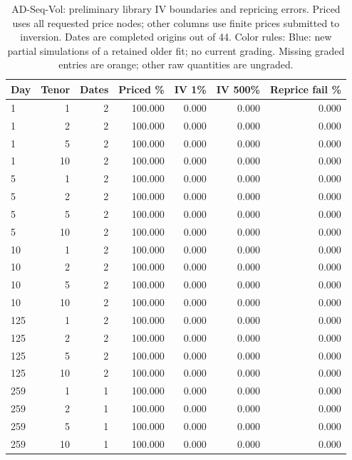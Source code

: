 \documentclass[11pt]{article}
\begin{document}
\begin{table}[H]\centering\small\setlength{\tabcolsep}{4pt}
\caption{AD-Seq-Vol: preliminary library IV boundaries and repricing errors. Priced uses all requested price nodes; other columns use finite prices submitted to inversion. Dates are completed origins out of 44. Color rules: Blue: new partial simulations of a retained older fit; no current grading. Missing graded entries are orange; other raw quantities are ungraded.}\label{tab:diffusion-boundary-base}
\begin{tabular}{@{}lrrrrrr@{}}
\toprule
Day & Tenor & Dates & Priced \% & IV 1\% & IV 500\% & Reprice fail \% \\
\midrule
1 & 1 & 2 & 100.000 & 0.000 & 0.000 & 0.000 \\
1 & 2 & 2 & 100.000 & 0.000 & 0.000 & 0.000 \\
1 & 5 & 2 & 100.000 & 0.000 & 0.000 & 0.000 \\
1 & 10 & 2 & 100.000 & 0.000 & 0.000 & 0.000 \\
5 & 1 & 2 & 100.000 & 0.000 & 0.000 & 0.000 \\
5 & 2 & 2 & 100.000 & 0.000 & 0.000 & 0.000 \\
5 & 5 & 2 & 100.000 & 0.000 & 0.000 & 0.000 \\
5 & 10 & 2 & 100.000 & 0.000 & 0.000 & 0.000 \\
10 & 1 & 2 & 100.000 & 0.000 & 0.000 & 0.000 \\
10 & 2 & 2 & 100.000 & 0.000 & 0.000 & 0.000 \\
10 & 5 & 2 & 100.000 & 0.000 & 0.000 & 0.000 \\
10 & 10 & 2 & 100.000 & 0.000 & 0.000 & 0.000 \\
125 & 1 & 2 & 100.000 & 0.000 & 0.000 & 0.000 \\
125 & 2 & 2 & 100.000 & 0.000 & 0.000 & 0.000 \\
125 & 5 & 2 & 100.000 & 0.000 & 0.000 & 0.000 \\
125 & 10 & 2 & 100.000 & 0.000 & 0.000 & 0.000 \\
259 & 1 & 1 & 100.000 & 0.000 & 0.000 & 0.000 \\
259 & 2 & 1 & 100.000 & 0.000 & 0.000 & 0.000 \\
259 & 5 & 1 & 100.000 & 0.000 & 0.000 & 0.000 \\
259 & 10 & 1 & 100.000 & 0.000 & 0.000 & 0.000 \\
\bottomrule\end{tabular}\end{table}
\end{document}
